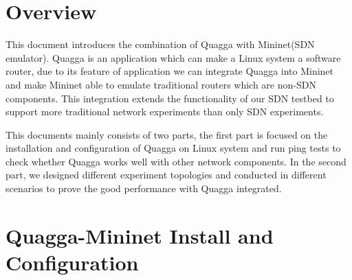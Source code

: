 \documentclass{article}
\begin{document}
\section{Overview}
This document introduces the combination of Quagga with Mininet(SDN emulator). Quagga is an application which can make a Linux system a software router, due to its feature of application we can integrate Quagga into Mininet and make Mininet able to emulate traditional routers which are non-SDN components. This integration extends the functionality of our SDN testbed to support more traditional network experiments than only SDN experiments.

This documents mainly consists of two parts, the first part is focused on the installation and configuration of Quagga on Linux system and run ping tests to check whether Quagga works well with other network components. In the second part, we designed different experiment topologies and conducted in different scenarios to prove the good performance with Quagga integrated.

\section{Quagga-Mininet Install and Configuration}


\end{document}
